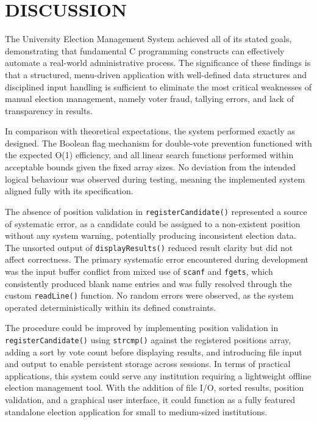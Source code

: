 \documentclass[12pt,a4paper]{article}
\begin{document}
\newpage
\section{DISCUSSION}

The University Election Management System achieved all of its stated goals,
demonstrating that fundamental C programming constructs can effectively automate a
real-world administrative process. The significance of these findings is that a
structured, menu-driven application with well-defined data structures and disciplined
input handling is sufficient to eliminate the most critical weaknesses of manual
election management, namely voter fraud, tallying errors, and lack of transparency in
results.

In comparison with theoretical expectations, the system performed exactly as designed.
The Boolean flag mechanism for double-vote prevention functioned with the expected
O(1) efficiency, and all linear search functions performed within acceptable bounds
given the fixed array sizes. No deviation from the intended logical behaviour was
observed during testing, meaning the implemented system aligned fully with its
specification.

The absence of position validation in \texttt{registerCandidate()} represented a source of
systematic error, as a candidate could be assigned to a non-existent position without
any system warning, potentially producing inconsistent election data. The unsorted
output of \texttt{displayResults()} reduced result clarity but did not affect correctness. The
primary systematic error encountered during development was the input buffer conflict
from mixed use of \texttt{scanf} and \texttt{fgets}, which consistently produced blank name entries
and was fully resolved through the custom \texttt{readLine()} function. No random errors were
observed, as the system operated deterministically within its defined constraints.

The procedure could be improved by implementing position validation in
\texttt{registerCandidate()} using \texttt{strcmp()} against the registered positions array, adding
a sort by vote count before displaying results, and introducing file input and output to
enable persistent storage across sessions. In terms of practical applications, this
system could serve any institution requiring a lightweight offline election management
tool. With the addition of file I/O, sorted results, position validation, and a graphical
user interface, it could function as a fully featured standalone election application for
small to medium-sized institutions.
\end{document}
